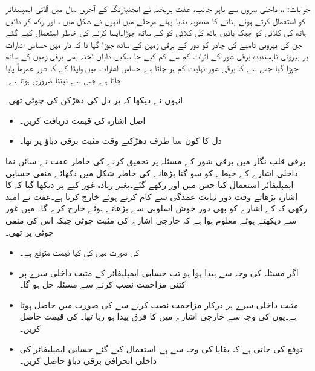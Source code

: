 جوابات: ،، داخلی سروں سے باہر جانب، 
عفت بریخنہ نے انجنیئرنگ کے آخری سال میں آلاتی ایمپلیفائر کو استعمال کرتے ہوئے  بنانے کا منصوبہ بنایا۔پہلے مرحلے میں انہوں نے شکل  میں ،  اور  رکھ کر دائیں ہاتھ کی کلائی کو  جبکہ بائیں ہاتھ کی کلائی کو  کے ساتھ جوڑا۔ایسا کرنے کی خاطر  استعمال کیے گئے جن کی بیرونی تامبے کی چادر کو دور کے برقی زمین کے ساتھ جوڑا گیا تا کہ تار میں حساس اشارات پر بیرونی ناپسندیدہ برقی شور کے اثرات کم سے کم کیے جا سکیں۔دایاں ٹخنہ بھی برقی زمین کے ساتھ جوڑا گیا جس سے  کا برقی شور نہایت کم ہو جاتا ہے۔حساس اشارات میں واپڈا کے  کا شور عموماً پایا جاتا ہے جس سے نپٹنا ضروری ہوتا ہے۔

انہوں نے دیکھا کہ  پر دل کی دھڑکن کی چوٹی  تھی۔
\begin{itemize}
\item
اصل اشارہ  کی قیمت دریافت کریں۔
\item
دل کا کون سا طرف دھڑکتے وقت مثبت برقی دباؤ پر تھا۔
\end{itemize}

برقی قلب نگار میں برقی شور کے مسئلہ پر تحقیق کرنے کی خاطر عفت نے سائن نما داخلی اشارے کے حیطے کو سو گنا بڑھانے کی خاطر  شکل  میں دکھائے منفی حسابی ایمپلیفائر استعمال کیا جس میں   اور  رکھے گئے۔بغیر زیادہ غور کیے  پر دیکھا گیا کہ  کا اشارہ بڑھاتے وقت دور نہایت عمدگی سے کام کرتے ہوئے  خارج کرتا ہے۔عفت نے امید رکھی کہ  کے اشارے کو بھی دور خوش اسلوبی سے بڑھاتے ہوئے  خارج کرے گا۔ میں غور سے دیکھتے ہوئے معلوم ہوا ہے کہ خارجی اشارے  کی مثبت چوٹی  جبکہ اس کی منفی چوٹی  پر تھی۔

\begin{itemize}
\item
{} کی صورت میں  کی کیا قیمت متوقع ہے۔
\item
اگر مسئلہ  کی وجہ سے پیدا ہوا ہو تب حسابی ایمپلیفائر کے مثبت داخلی سرے  پر  کتنی مزاحمت نصب کرنے سے مسئلہ حل ہو گا۔
\item
مثبت داخلی سرے  پر درکار مزاحمت نصب کرنے سے  کی صورت میں  حاصل ہوتا ہے۔یوں  کی وجہ سے خارجی اشارے میں  کا فرق پیدا ہو رہا تھا۔ کی قیمت حاصل کریں۔
\item 
توقع کی جاتی ہے کہ بقایا   کی وجہ سے ہے۔استعمال کیے گئے حسابی ایمپلیفائر کی داخلی انحرافی برقی دباؤ  حاصل کریں۔
\end{itemize}

